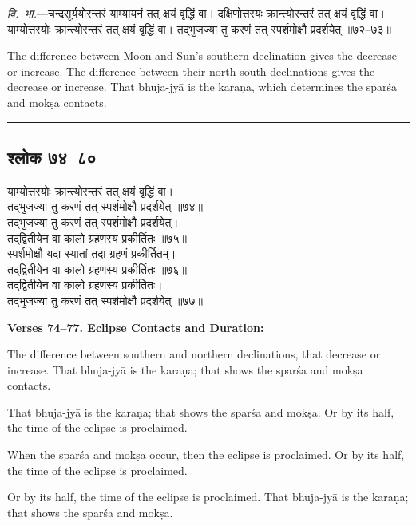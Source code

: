 \documentclass[11pt,a4paper]{article}
\newcommand{\longline}{\noindent\rule{\textwidth}{0.4pt}}
\newcommand{\dev}[1]{{\devanagarifont #1}}
\newcommand{\sectsep}{\par\vspace{0.8em}\longline\vspace{0.8em}}
\begin{document}
\vspace{0.5em}
\begin{minipage}[t]{0.48\textwidth}
\small\devanagarifont
\textit{वि.~भा.}---चन्द्रसूर्ययोरन्तरं याम्यायनं तत् क्षयं वृद्धिं वा। दक्षिणोत्तरयः क्रान्त्योरन्तरं तत् क्षयं वृद्धिं वा। याम्योत्तरयोः क्रान्त्योरन्तरं तत् क्षयं वृद्धिं वा। तद्‌भुजज्या तु करणं तत् स्पर्शमोक्षौ प्रदर्शयेत् ॥७२--७३॥
\end{minipage}%
\hfill
\begin{minipage}[t]{0.48\textwidth}
\small
The difference between Moon and Sun's southern declination gives the decrease or increase. The difference between their north-south declinations gives the decrease or increase. That bhuja-jy\=a is the kara\d{n}a, which determines the spar\'sa and mok\d{s}a contacts.
\end{minipage}

\sectsep

\subsection{\dev{श्लोक ७४--८०}}

\begin{minipage}[t]{0.48\textwidth}
\small\devanagarifont
याम्योत्तरयोः क्रान्त्योरन्तरं तत् क्षयं वृद्धिं वा।\\
तद्‌भुजज्या तु करणं तत् स्पर्शमोक्षौ प्रदर्शयेत् ॥७४॥\\[0.5em]
तद्‌भुजज्या तु करणं तत् स्पर्शमोक्षौ प्रदर्शयेत्।\\
तद्‌द्वितीयेन वा कालो ग्रहणस्य प्रकीर्तितः ॥७५॥\\[0.5em]
स्पर्शमोक्षौ यदा स्यातां तदा ग्रहणं प्रकीर्तितम्।\\
तद्‌द्वितीयेन वा कालो ग्रहणस्य प्रकीर्तितः ॥७६॥\\[0.5em]
तद्‌द्वितीयेन वा कालो ग्रहणस्य प्रकीर्तितः।\\
तद्‌भुजज्या तु करणं तत् स्पर्शमोक्षौ प्रदर्शयेत् ॥७७॥
\end{minipage}%
\hfill
\begin{minipage}[t]{0.48\textwidth}
\small
\textbf{Verses 74--77. Eclipse Contacts and Duration:}

The difference between southern and northern declinations, that decrease or increase. That bhuja-jy\=a is the kara\d{n}a; that shows the spar\'sa and mok\d{s}a contacts.

That bhuja-jy\=a is the kara\d{n}a; that shows the spar\'sa and mok\d{s}a. Or by its half, the time of the eclipse is proclaimed.

When the spar\'sa and mok\d{s}a occur, then the eclipse is proclaimed. Or by its half, the time of the eclipse is proclaimed.

Or by its half, the time of the eclipse is proclaimed. That bhuja-jy\=a is the kara\d{n}a; that shows the spar\'sa and mok\d{s}a.
\end{minipage}
\end{document}

